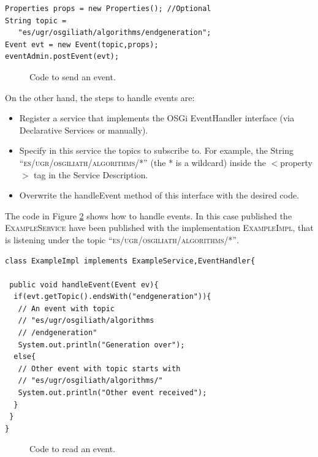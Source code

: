 \newsavebox{\mintedboxOSGIpostevent}
\begin{lrbox}{\mintedboxOSGIpostevent}
\begin{minipage}{10cm}
\begin{verbatim}
Properties props = new Properties(); //Optional
String topic = 
   "es/ugr/osgiliath/algorithms/endgeneration";
Event evt = new Event(topic,props);
eventAdmin.postEvent(evt);
\end{verbatim}
\end{minipage}
\end{lrbox}

\begin{figure}
\usebox{\mintedboxOSGIpostevent}
\caption{Code to send an event.}
\label{fig:OSGIpostevent} 
\end{figure}
		
On the other hand, the steps to handle events are:
\begin{itemize}
\item Register a service that implements the OSGi EventHandler interface (via Declarative Services or manually).
\item Specify in this service the topics to subscribe to. For example, the String \textsc{ ``es/ugr/osgiliath/algorithms/*''} (the * is a wildcard) inside the $<$property$>$ tag in the Service Description.
\item Overwrite the handleEvent method of this interface with the desired code.
\end{itemize}

The code  in Figure \ref{fig:OSGIreadevent} shows how to handle events. In this case published the \textsc{ ExampleService} have been published with the implementation \textsc{ ExampleImpl}, that is listening under the topic \textsc{ ``es/ugr/osgiliath/algorithms/*''}.



\newsavebox{\mintedboxOSGIreadevent}
\begin{lrbox}{\mintedboxOSGIreadevent}
\begin{minipage}{10cm}
\begin{verbatim}
class ExampleImpl implements ExampleService,EventHandler{

 public void handleEvent(Event ev){
  if(evt.getTopic().endsWith("endgeneration")){
   // An event with topic 
   // "es/ugr/osgiliath/algorithms
   // /endgeneration"
   System.out.println("Generation over");
  else{
   // Other event with topic starts with
   // "es/ugr/osgiliath/algorithms/"
   System.out.println("Other event received");
  }
 }
}
\end{verbatim}
\end{minipage}
\end{lrbox}

\begin{figure}
\usebox{\mintedboxOSGIreadevent}
\caption{Code to read an event.}
\label{fig:OSGIreadevent} 
\end{figure}